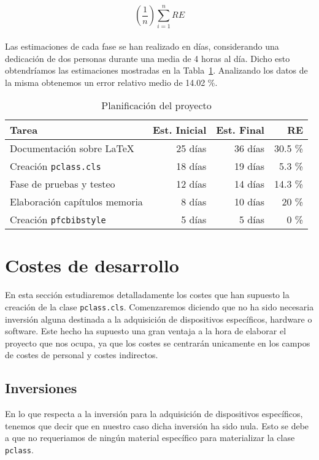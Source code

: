 	\begin{displaymath}
     \left(\frac{1}{n}\right) \sum_{i=1}^{n} RE   
	\end{displaymath} \\
	
	
	Las estimaciones de cada fase se han realizado en d\'ias, considerando una dedicaci\'on de dos personas durante una
	media de 4 horas al d\'ia. Dicho esto obtendr\'iamos las estimaciones mostradas en la Tabla~\ref{tab:planif}.										Analizando los datos de la misma obtenemos un error relativo medio de 14.02 \%.														
																												
\begin{table}
	\centering
		\begin{tabular}{|l|r|r|r|}
			\hline
			\textbf{Tarea} & \textbf{Est. Inicial} & \textbf{Est. Final} & \textbf{RE}\\ \hline \hline
			 Documentaci\'on sobre \LaTeX{}  & 25 d\'ias & 36 d\'ias & 30.5 \%  \\
			 Creaci\'on \texttt{pclass.cls} & 18 d\'ias & 19 d\'ias & 5.3 \% \\
			 Fase de pruebas y testeo  & 12 d\'ias & 14 d\'ias & 14.3  \% \\
			 Elaboraci\'on cap\'itulos memoria & 8 d\'ias & 10 d\'ias & 20 \% \\
			 Creaci\'on \texttt{pfcbibstyle}  & 5 d\'ias & 5 d\'ias & 0 \% \\		
			\hline
		\end{tabular}
	\caption{Planificaci\'on del proyecto}
	\label{tab:planif}
\end{table}



\section{Costes de desarrollo}
	En esta secci\'on estudiaremos detalladamente los costes que han supuesto la creaci\'on de la clase \texttt{pclass.cls}.
	Comenzaremos diciendo que no ha sido necesaria inversi\'on alguna destinada a la adquisici\'on de dispositivos 
	espec\'ificos, hardware o software. Este hecho ha supuesto una gran ventaja a la hora de elaborar el proyecto que nos 
	ocupa, ya que los costes se centrar\'an unicamente en los campos de costes de personal y costes indirectos.
	
	
	\subsection{Inversiones}
	En lo que respecta a la inversi\'on para la adquisici\'on de dispositivos espec\'ificos, tenemos que decir que en 
	nuestro caso dicha inversi\'on ha sido nula. Esto se debe a que no requeriamos de ning\'un material espec\'ifico para
	materializar la clase \texttt{pclass}.
	
